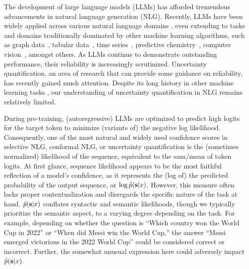 The development of large language models (LLMs) has afforded tremendous advancements in natural language generation (NLG). 
Recently, LLMs have been widely applied across various natural language domains \citep{zhang2023sentiment,wang2023gpt,alves-etal-2023-steering,zhang-etal-2024-la-ucl}, even extending to tasks and domains traditionally dominated by other machine learning algorithms, such as graph data~\citep{fatemi2024talk}, tabular data~\citep{borisov2023language, hegselmann2023tabllm}, time series~\citep{gruver2023llmtime, rasul2024lagllama}, predictive chemistry~\citep{Jablonka2024LeveragingLL, shi2023relm}, computer vision~\citep{wang2023visionllm}, amongst others.
As LLMs continue to demonstrate outstanding performance, their reliability is increasingly scrutinized. 
Uncertainty quantification, an area of research that can provide some guidance on reliability, has recently gained much attention. 
Despite its long history in other machine learning tasks \citep{gawlikowski2023survey}, our understanding of uncertainty quantification in NLG remains relatively limited. %

During pre-training, (autoregressive) LLMs are optimized to predict high logits for the target token to minimize (variants of) the negative log likelihood. 
Consequently, one of the most natural and widely used confidence scores in selective NLG, conformal NLG, or uncertainty quantification is the (sometimes normalized) likelihood of the sequence, equivalent to the sum/mean of token logits. 
At first glance, sequence likelihood appears to be the most faithful reflection of a model's confidence, as it represents the (log of) the predicted probability of the output sequence, or $\log{\hat{p}(\mathbf{s}|x)}$. 
However, this measure often lacks proper contextualization and disregards the specific nature of the task at hand. 
$\hat{p}(\mathbf{s}|x)$ conflates syntactic and semantic likelihoods, though we typically prioritize the semantic aspect, to a varying degree depending on the task. 
For example, depending on whether the question is ``Which country won the World Cup in 2022'' or ``When did Messi win the World Cup,'' the answer ``Messi emerged victorious in the 2022 World Cup'' could be considered correct or incorrect. 
Further, the somewhat unusual expression here could adversely impact $\hat{p}(\mathbf{s}|x)$.

